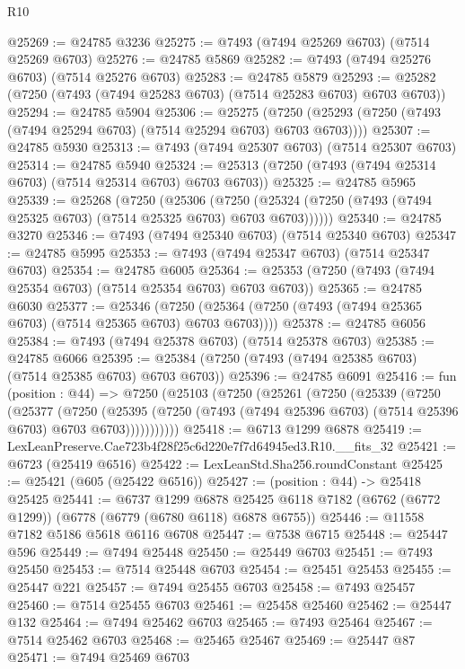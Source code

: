 \begin{lexlean}{R10}
\begin{coremodule}
@25269 := @24785 @3236
@25275 := @7493 (@7494 @25269 @6703) (@7514 @25269 @6703)
@25276 := @24785 @5869
@25282 := @7493 (@7494 @25276 @6703) (@7514 @25276 @6703)
@25283 := @24785 @5879
@25293 := @25282 (@7250 (@7493 (@7494 @25283 @6703) (@7514 @25283 @6703) @6703 @6703))
@25294 := @24785 @5904
@25306 := @25275
    (@7250 (@25293 (@7250 (@7493 (@7494 @25294 @6703) (@7514 @25294 @6703) @6703 @6703))))
@25307 := @24785 @5930
@25313 := @7493 (@7494 @25307 @6703) (@7514 @25307 @6703)
@25314 := @24785 @5940
@25324 := @25313 (@7250 (@7493 (@7494 @25314 @6703) (@7514 @25314 @6703) @6703 @6703))
@25325 := @24785 @5965
@25339 := @25268
    (@7250
      (@25306
        (@7250 (@25324 (@7250 (@7493 (@7494 @25325 @6703) (@7514 @25325 @6703) @6703 @6703))))))
@25340 := @24785 @3270
@25346 := @7493 (@7494 @25340 @6703) (@7514 @25340 @6703)
@25347 := @24785 @5995
@25353 := @7493 (@7494 @25347 @6703) (@7514 @25347 @6703)
@25354 := @24785 @6005
@25364 := @25353 (@7250 (@7493 (@7494 @25354 @6703) (@7514 @25354 @6703) @6703 @6703))
@25365 := @24785 @6030
@25377 := @25346
    (@7250 (@25364 (@7250 (@7493 (@7494 @25365 @6703) (@7514 @25365 @6703) @6703 @6703))))
@25378 := @24785 @6056
@25384 := @7493 (@7494 @25378 @6703) (@7514 @25378 @6703)
@25385 := @24785 @6066
@25395 := @25384 (@7250 (@7493 (@7494 @25385 @6703) (@7514 @25385 @6703) @6703 @6703))
@25396 := @24785 @6091
@25416 := fun (position : @44) =>
  @7250
    (@25103
      (@7250
        (@25261
          (@7250
            (@25339
              (@7250
                (@25377
                  (@7250
                    (@25395
                      (@7250 (@7493 (@7494 @25396 @6703) (@7514 @25396 @6703) @6703 @6703)))))))))))
@25418 := @6713 @1299 @6878
@25419 := LexLeanPreserve.Cae723b4f28f25c6d220e7f7d64945ed3.R10.__fits_32
@25421 := @6723 (@25419 @6516)
@25422 := LexLeanStd.Sha256.roundConstant
@25425 := @25421 (@605 (@25422 @6516))
@25427 := (position : @44) -> @25418 @25425
@25441 := @6737
    @1299
    @6878
    @25425
    @6118
    @7182
    (@6762 (@6772 @1299))
    (@6778 (@6779 (@6780 @6118) @6878 @6755))
@25446 := @11558 @7182 @5186 @5618 @6116 @6708
@25447 := @7538 @6715
@25448 := @25447 @596
@25449 := @7494 @25448
@25450 := @25449 @6703
@25451 := @7493 @25450
@25453 := @7514 @25448 @6703
@25454 := @25451 @25453
@25455 := @25447 @221
@25457 := @7494 @25455 @6703
@25458 := @7493 @25457
@25460 := @7514 @25455 @6703
@25461 := @25458 @25460
@25462 := @25447 @132
@25464 := @7494 @25462 @6703
@25465 := @7493 @25464
@25467 := @7514 @25462 @6703
@25468 := @25465 @25467
@25469 := @25447 @87
@25471 := @7494 @25469 @6703

\end{coremodule}
\end{lexlean}
